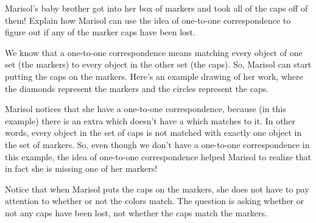 \documentclass{ximera}
\begin{document}
\begin{example}
Marisol's baby brother got into her box of markers and took all of the caps off of them! Explain how Marisol can  use the idea of one-to-one correspondence to figure out if any of the marker caps have been lost. 


\begin{explanation} 
We know that a one-to-one correspondence means matching every object of one set (the markers) to every object in the other set (the caps). So, Marisol can start putting the caps on the markers. Here's an example drawing of her work, where the diamonds represent the markers and the circles represent the caps.
\begin{image}
\end{image}
Marisol notices that she  have a one-to-one correspondence, because (in this example) there is an extra  which doesn't have a  which matches to it. In other words, every object in the set of caps is not matched with exactly one object in the set of markers. So, even though we don't have a one-to-one correspondence in this example, the idea of one-to-one correspondence helped Marisol to realize that in fact she is missing one of her markers!
\end{explanation}
\end{example}


Notice that when Marisol puts the caps on the markers, she does not have to pay attention to whether or not the colors match. The question is asking whether or not any caps have been lost, not whether the caps match the markers.
\end{document}

